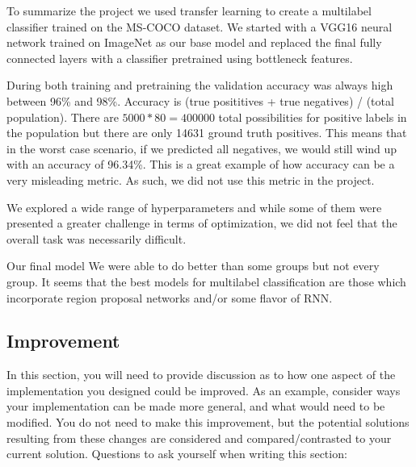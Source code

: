 \documentclass[12pt,journal,compsoc]{IEEEtran}
\begin{document}

To summarize the project we used transfer learning to create a multilabel classifier trained on the MS-COCO dataset.  We started with a VGG16 neural network trained on ImageNet as our base model and replaced the final fully connected layers with a classifier pretrained using bottleneck features.  


During both training and pretraining the validation accuracy was always high between 96\% and 98\%. Accuracy is (true posititives + true negatives) / (total population).  There are $5000*80=400000$ total possibilities for positive labels in the population but there are only 14631 ground truth positives.  This means that in the worst case scenario, if we predicted all negatives, we would still wind up with an accuracy of 96.34\%. This is a great example of how accuracy can be a very misleading metric. As such, we did not use this metric in the project.


We explored a wide range of hyperparameters and while some of them were presented a greater challenge in terms of optimization, we did not feel that the overall task was necessarily difficult.


Our final model We were able to do better than some groups but not every group.  It seems that the best models for multilabel classification are those which incorporate region proposal networks and/or some flavor of RNN.

\subsection{Improvement}
In this section, you will need to provide discussion as to how one aspect of the implementation you designed could be improved. As an example, consider ways your implementation can be made more general, and what would need to be modified. You do not need to make this improvement, but the potential solutions resulting from these changes are considered and compared/contrasted to your current solution. Questions to ask yourself when writing this section:
\end{document}
